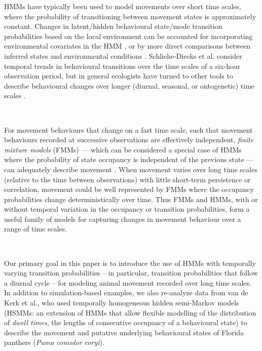 \documentclass{bmcart}
\begin{document}
HMMs have typically been used to model movements over short time
scales, where the probability of transitioning between movement states is
approximately constant. Changes in latent/hidden behavioural state/mode transition 
probabilities based on
the local environment can be accounted for incorporating environmental
covariates in the HMM \cite{patterson_classifying_2009}, or by more
direct comparisons between inferred states and environmental
conditions \cite{fryxell_multiple_2008}. Schliehe-Diecks et al. 
\cite{schliehe-diecks_application_2012}
consider temporal trends in behavioural transitions over the
time scales of a six-hour
observation period, but
in general ecologists have turned to other tools to describe behavioural
changes over longer (diurnal, seasonal, or ontogenetic) time scales \cite{gurarie2009novel}.

\

For movement behaviours that change on a fast time scale, such
that movement behaviours recorded
at successive observations are effectively independent,
\emph{finite mixture models} (FMMs) --- which can be considered
a special case of HMMs where the
probability of state occupancy is independent of the previous state ---
can adequately describe movement \cite{tracey_mapping_2012}.  
When movement varies over long time scales
(relative to the time between observations) with little short-term
persistence or correlation, movement could be well represented by FMMs
where the occupancy probabilities change deterministically over time.
Thus FMMs and HMMs,
with or without temporal variation in the occupancy or transition
probabilities, form a useful family of models for capturing
changes in movement behaviour over a range of time scales.

\

Our primary goal in this paper is to introduce the use of
HMMs with temporally varying transition probabilities -- in particular,
transition probabilities that follow a diurnal cycle -- for modeling
animal movement recorded over long time scales.  
In addition to simulation-based examples,
we also re-analyze data from 
van de Kerk et al.\cite{kerk2015hidden}, who used temporally homogeneous hidden semi-Markov
models (HSMMs: an extension of HMMs that allow
flexible modelling of the distribution of \emph{dwell times}, the 
lengths of consecutive occupancy of a behavioural state) to
describe the movement and putative underlying
behavioural states of Florida panthers (\emph{Puma concolor coryi}).
% 
% 
\
\end{document}
